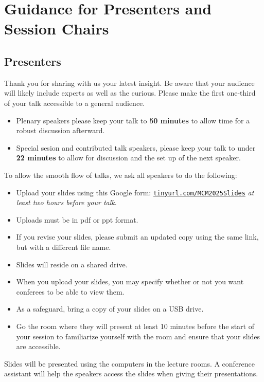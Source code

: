 \section{Guidance for Presenters and Session Chairs}

\subsection{Presenters}

Thank you for sharing with us your latest insight.  Be aware that your audience will likely include experts as well as the curious.  Please make the first one-third of your talk accessible to a general audience.
\begin{itemize}
	\item Plenary speakers please keep your talk to \textbf{50 minutes} to allow time for a robust discussion afterward.
	\item Special sesion and contributed talk speakers, please keep your talk to under \textbf{22 minutes} to allow for discussion and the set up of the next speaker.
\end{itemize}

To allow the smooth flow of talks, we ask all speakers to do the following:
\begin{itemize}
	\item Upload your slides using this Google form: \href{https://tinyurl.com/MCM2025Slides}{\nolinkurl{tinyurl.com/MCM2025Slides}}  \emph{at least two hours before your talk}.
	\item Uploads must be in pdf or ppt format.
	\item If you revise your slides, please submit an updated copy using the same link, but with a different file name.
	\item Slides will reside on a shared drive.
	\item When you upload your slides, you may specify whether or not you want conferees to be able to view them.
	\item As a safeguard, bring a copy of your slides on a USB drive.
	\item Go the room where they will present at least 10 minutes before the start of your session to familiarize yourself with the room and ensure that your slides are accessible.
\end{itemize}
Slides will be presented using the computers in the lecture rooms.  A conference assistant will help the speakers access the slides when giving their presentations.

